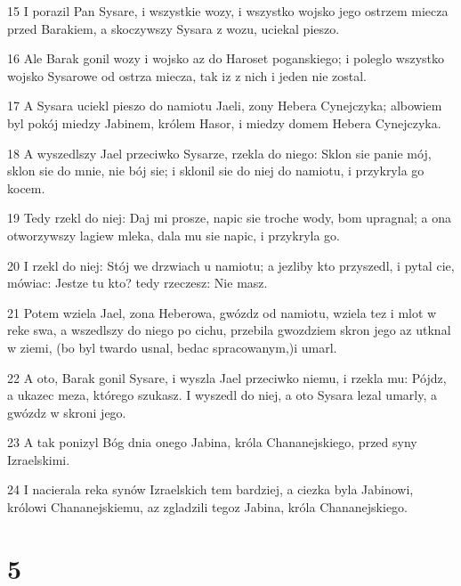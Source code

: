 \par 15 I porazil Pan Sysare, i wszystkie wozy, i wszystko wojsko jego ostrzem miecza przed Barakiem, a skoczywszy Sysara z wozu, uciekal pieszo.
\par 16 Ale Barak gonil wozy i wojsko az do Haroset poganskiego; i poleglo wszystko wojsko Sysarowe od ostrza miecza, tak iz z nich i jeden nie zostal.
\par 17 A Sysara uciekl pieszo do namiotu Jaeli, zony Hebera Cynejczyka; albowiem byl pokój miedzy Jabinem, królem Hasor, i miedzy domem Hebera Cynejczyka.
\par 18 A wyszedlszy Jael przeciwko Sysarze, rzekla do niego: Sklon sie panie mój, sklon sie do mnie, nie bój sie; i sklonil sie do niej do namiotu, i przykryla go kocem.
\par 19 Tedy rzekl do niej: Daj mi prosze, napic sie troche wody, bom upragnal; a ona otworzywszy lagiew mleka, dala mu sie napic, i przykryla go.
\par 20 I rzekl do niej: Stój we drzwiach u namiotu; a jezliby kto przyszedl, i pytal cie, mówiac: Jestze tu kto? tedy rzeczesz: Nie masz.
\par 21 Potem wziela Jael, zona Heberowa, gwózdz od namiotu, wziela tez i mlot w reke swa, a wszedlszy do niego po cichu, przebila gwozdziem skron jego az utknal w ziemi, (bo byl twardo usnal, bedac spracowanym,)i umarl.
\par 22 A oto, Barak gonil Sysare, i wyszla Jael przeciwko niemu, i rzekla mu: Pójdz, a ukazec meza, którego szukasz. I wyszedl do niej, a oto Sysara lezal umarly, a gwózdz w skroni jego.
\par 23 A tak ponizyl Bóg dnia onego Jabina, króla Chananejskiego, przed syny Izraelskimi.
\par 24 I nacierala reka synów Izraelskich tem bardziej, a ciezka byla Jabinowi, królowi Chananejskiemu, az zgladzili tegoz Jabina, króla Chananejskiego.

\chapter{5}

